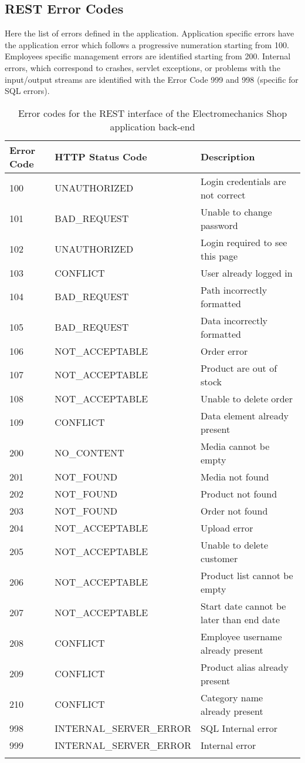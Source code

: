 \subsection{REST Error Codes}

Here the list of errors defined in the application. Application specific errors have the application error which follows a progressive numeration starting from 100. Employees specific management errors are identified starting from 200. Internal errors, which correspond to crashes, servlet exceptions, or problems with the input/output streams are identified with the Error Code 999 and 998 (specific for SQL errors).

\begin{longtable}{|p{}|p{} |p{}|}
\hline
\textbf{Error Code} & \textbf{HTTP Status Code} & \textbf{Description} \\\hline

100 & UNAUTHORIZED & Login credentials are not correct \\\hline
101 & BAD\_REQUEST & Unable to change password \\\hline
102 & UNAUTHORIZED & Login required to see this page \\\hline
103 & CONFLICT & User already logged in \\\hline
104 & BAD\_REQUEST & Path incorrectly formatted \\\hline
105 & BAD\_REQUEST & Data incorrectly formatted \\\hline
106 & NOT\_ACCEPTABLE & Order error \\\hline
107 & NOT\_ACCEPTABLE & Product are out of stock \\\hline
108 & NOT\_ACCEPTABLE & Unable to delete order \\\hline
109 & CONFLICT & Data element already present \\\hline

200 & NO\_CONTENT & Media cannot be empty \\\hline
201 & NOT\_FOUND & Media not found \\\hline
202 & NOT\_FOUND & Product not found \\\hline
203 & NOT\_FOUND & Order not found \\\hline
204 & NOT\_ACCEPTABLE & Upload error \\\hline
205 & NOT\_ACCEPTABLE & Unable to delete customer \\\hline
206 & NOT\_ACCEPTABLE & Product list cannot be empty \\\hline
207 & NOT\_ACCEPTABLE & Start date cannot be later than end date \\\hline
208 & CONFLICT & Employee username already present \\\hline
209 & CONFLICT & Product alias already present \\\hline
210 & CONFLICT & Category name already present \\\hline

998 & INTERNAL\_SERVER\_ERROR & SQL Internal error \\\hline
999 & INTERNAL\_SERVER\_ERROR & Internal error \\\hline

\caption{Error codes for the REST interface of the Electromechanics Shop application back-end}
\label{tab:ErrorRest}
\end{longtable}
